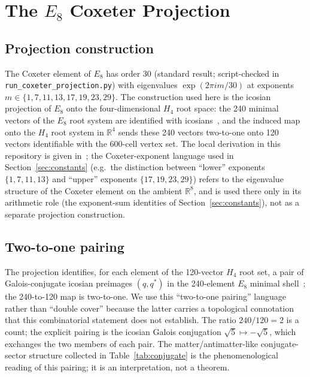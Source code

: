 \documentclass[12pt]{article}
\begin{document}
\section{The $E_8$ Coxeter Projection}\label{sec:coxeter}

\begin{center}
\end{center}

\subsection{Projection construction}

The Coxeter element of $E_8$ has order 30 (standard result; script-checked in \texttt{run\_coxeter\_projection.py}) with eigenvalues $\exp(2\pi i m/30)$ at exponents $m \in \{1, 7, 11, 13, 17, 19, 23, 29\}$. The construction used here is the icosian projection of $E_8$ onto the four-dimensional $H_4$ root space: the 240 minimal vectors of the $E_8$ root system are identified with icosians~\citep{MoodyPatera1993, CascadeAlgSubstrate}, and the induced map onto the $H_4$ root system in $\mathbb{R}^4$ sends these 240 vectors two-to-one onto 120 vectors identifiable with the 600-cell vertex set. The local derivation in this repository is given in~\citet{CascadeAlgSubstrate}; the Coxeter-exponent language used in Section~\ref{sec:constants} (e.g.\ the distinction between ``lower'' exponents $\{1, 7, 11, 13\}$ and ``upper'' exponents $\{17, 19, 23, 29\}$) refers to the eigenvalue structure of the Coxeter element on the ambient $\mathbb{R}^8$, and is used there only in its arithmetic role (the exponent-sum identities of Section~\ref{sec:constants}), not as a separate projection construction.

\subsection{Two-to-one pairing}

The projection identifies, for each element of the 120-vector $H_4$ root set, a pair of Galois-conjugate icosian preimages $(q, q^*)$ in the 240-element $E_8$ minimal shell~\citep{CascadeAlgSubstrate}; the 240-to-120 map is two-to-one. We use this ``two-to-one pairing'' language rather than ``double cover'' because the latter carries a topological connotation that this combinatorial statement does not establish. The ratio $240/120 = 2$ is a count; the explicit pairing is the icosian Galois conjugation $\sqrt{5} \mapsto -\sqrt{5}$, which exchanges the two members of each pair. The matter/antimatter-like conjugate-sector structure collected in Table~\ref{tab:conjugate} is the phenomenological reading of this pairing; it is an interpretation, not a theorem.
\end{document}
